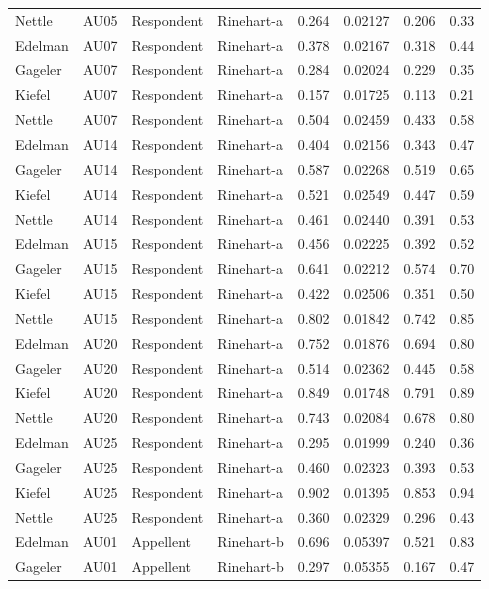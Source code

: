 \documentclass{monashthesis}
\begin{document}
\begin{center}
\begin{longtable}{llllllll}
Nettle & AU05 & Respondent & Rinehart-a & 0.264 & 0.02127 & 0.206 & 0.33 \\
Edelman & AU07 & Respondent & Rinehart-a & 0.378 & 0.02167 & 0.318 & 0.44 \\
Gageler & AU07 & Respondent & Rinehart-a & 0.284 & 0.02024 & 0.229 & 0.35 \\
Kiefel & AU07 & Respondent & Rinehart-a & 0.157 & 0.01725 & 0.113 & 0.21 \\
Nettle & AU07 & Respondent & Rinehart-a & 0.504 & 0.02459 & 0.433 & 0.58 \\
Edelman & AU14 & Respondent & Rinehart-a & 0.404 & 0.02156 & 0.343 & 0.47 \\
Gageler & AU14 & Respondent & Rinehart-a & 0.587 & 0.02268 & 0.519 & 0.65 \\
Kiefel & AU14 & Respondent & Rinehart-a & 0.521 & 0.02549 & 0.447 & 0.59 \\
Nettle & AU14 & Respondent & Rinehart-a & 0.461 & 0.02440 & 0.391 & 0.53 \\
Edelman & AU15 & Respondent & Rinehart-a & 0.456 & 0.02225 & 0.392 & 0.52 \\
Gageler & AU15 & Respondent & Rinehart-a & 0.641 & 0.02212 & 0.574 & 0.70 \\
Kiefel & AU15 & Respondent & Rinehart-a & 0.422 & 0.02506 & 0.351 & 0.50 \\
Nettle & AU15 & Respondent & Rinehart-a & 0.802 & 0.01842 & 0.742 & 0.85 \\
Edelman & AU20 & Respondent & Rinehart-a & 0.752 & 0.01876 & 0.694 & 0.80 \\
Gageler & AU20 & Respondent & Rinehart-a & 0.514 & 0.02362 & 0.445 & 0.58 \\
Kiefel & AU20 & Respondent & Rinehart-a & 0.849 & 0.01748 & 0.791 & 0.89 \\
Nettle & AU20 & Respondent & Rinehart-a & 0.743 & 0.02084 & 0.678 & 0.80 \\
Edelman & AU25 & Respondent & Rinehart-a & 0.295 & 0.01999 & 0.240 & 0.36 \\
Gageler & AU25 & Respondent & Rinehart-a & 0.460 & 0.02323 & 0.393 & 0.53 \\
Kiefel & AU25 & Respondent & Rinehart-a & 0.902 & 0.01395 & 0.853 & 0.94 \\
Nettle & AU25 & Respondent & Rinehart-a & 0.360 & 0.02329 & 0.296 & 0.43 \\
Edelman & AU01 & Appellent & Rinehart-b & 0.696 & 0.05397 & 0.521 & 0.83 \\
Gageler & AU01 & Appellent & Rinehart-b & 0.297 & 0.05355 & 0.167 & 0.47 \\

\end{longtable}
\end{center}
\end{document}

